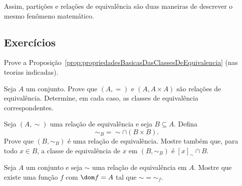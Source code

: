 Assim, partições e relações de equivalência são duas maneiras de descrever o mesmo fenômeno matemático.

\subsection*{Exercícios}
\begin{exercise}\label{exr:propriedadesBasicasDasClassesDeEquivalencia}
    Prove a Proposição~\ref{prop:propriedadesBasicasDasClassesDeEquivalencia} (nas teorias indicadas).
\end{exercise}

\begin{exercise}[$\BST$]
    Seja $A$ um conjunto.
    Prove que $(A, =)$ e $(A, A \times A)$ são relações de equivalência.
    Determine, em cada caso, as classes de equivalência correspondentes.
\end{exercise}

\begin{exercise}[$\BST$]
    Seja $(A, \sim)$ uma relação de equivalência e seja $B \subseteq A$.
    Defina
    \[
    \sim_B = \sim \cap (B \times B).
    \]
    Prove que $(B, \sim_B)$ é uma relação de equivalência.
    Mostre também que, para todo $x \in B$, a classe de equivalência de $x$ em $(B, \sim_B)$ é $[x]_{\sim} \cap B$.
\end{exercise}

\begin{exercise}[$\ZmI$]
    Seja $A$ um conjunto e seja $\sim$ uma relação de equivalência em $A$.
    Mostre que existe uma função $f$ com $\dom f = A$ tal que $\sim = \sim_f$.
\end{exercise}
